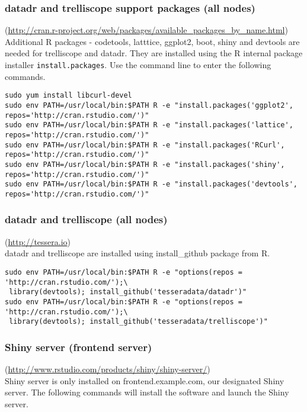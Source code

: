 \subsubsection{datadr and trelliscope support packages (all nodes)}(\url{http://cran.r-project.org/web/packages/available\_packages\_by\_name.html})\\
Additional R packages - codetools, latttice, ggplot2, boot, shiny and devtools are needed for trelliscope and datadr. They are installed using the R internal package installer \verb|install.packages|. Use the command line to enter the following commands. 
\begin{verbatim}
sudo yum install libcurl-devel
sudo env PATH=/usr/local/bin:$PATH R -e "install.packages('ggplot2', repos='http://cran.rstudio.com/')"
sudo env PATH=/usr/local/bin:$PATH R -e "install.packages('lattice', repos='http://cran.rstudio.com/')"
sudo env PATH=/usr/local/bin:$PATH R -e "install.packages('RCurl', repos='http://cran.rstudio.com/')"
sudo env PATH=/usr/local/bin:$PATH R -e "install.packages('shiny', repos='http://cran.rstudio.com/')"
sudo env PATH=/usr/local/bin:$PATH R -e "install.packages('devtools', repos='http://cran.rstudio.com/')"
\end{verbatim}

\subsubsection{datadr and trelliscope (all nodes)}(\url{http://tessera.io})\\
datadr and trelliscope are installed using install\_github package from R. 
\begin{verbatim}
sudo env PATH=/usr/local/bin:$PATH R -e "options(repos = 'http://cran.rstudio.com/');\
 library(devtools); install_github('tesseradata/datadr')"
sudo env PATH=/usr/local/bin:$PATH R -e "options(repos = 'http://cran.rstudio.com/');\
 library(devtools); install_github('tesseradata/trelliscope')"
\end{verbatim}

\subsubsection{Shiny server (frontend server)}(\url{http://www.rstudio.com/products/shiny/shiny-server/})\\

Shiny server is only installed on frontend.example.com, our designated
Shiny server. The following commands will install the software
and launch the Shiny server.

